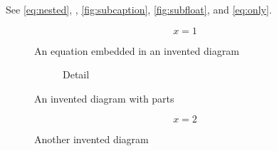 See \eqref{eq:nested}, , \ref{fig:subcaption},
\ref{fig:subfloat}, and \eqref{eq:only}.
\begin{figure}
\caption{An equation embedded in an invented diagram}
\begin{equation}x=1\label{eq:nested}\end{equation}
\end{figure}
\begin{figure}
\begin{subfigure}{0.4\linewidth}\caption{Detail}\label{fig:child}\end{subfigure}
\label{fig:subcaption}
\caption{An invented diagram with parts}\label{fig:parent}
\end{figure}
\begin{figure}
\begin{equation}x=2\label{eq:only}\end{equation}
\caption{Another invented diagram}\label{fig:unreferenced}
\end{figure}
\nocite{*}
